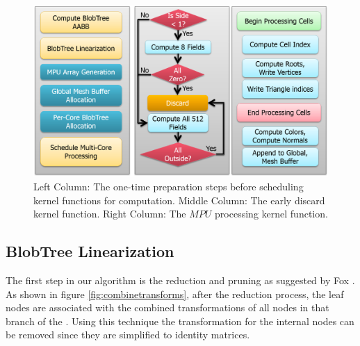 \begin{figure}[H]
  \centering
  \includegraphics[width=0.9\linewidth]{figures/cpupoly/AlgorithmHighLevelView}
  \caption{\label{fig:AlgorithmHighLevelView}
  {Left Column: The one-time preparation steps before scheduling kernel functions for computation.
  Middle Column: The early discard kernel function. Right Column: The $MPU$ processing kernel function.}
}
\end{figure}

\subsection{BlobTree Linearization}\label{sec:linearization}
The first step in our algorithm is the \blob reduction and pruning as suggested by Fox \etal \cite{Fox2002}.
As shown in figure \ref{fig:combinetransforms}, after the reduction process, the 
leaf nodes are associated with the combined transformations of all nodes in that branch of the 
\blob. Using this technique the transformation for the internal nodes can be 
removed since they are simplified to identity matrices. 


